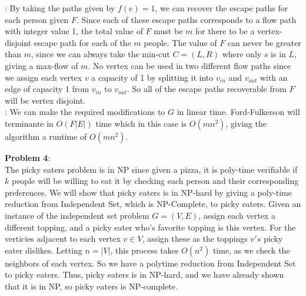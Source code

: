 \documentclass{article}
\begin{document}
: By taking the paths given by $f(e) = 1$, we can recover the escape paths for each person given $F$. Since each of these escape paths corresponds to a flow path with integer value 1, the total value of $F$ must be $m$ for there to be a vertex-disjoint escape path for each of the $m$ people. The value of $F$ can never be greater than $m$, since we can always take the min-cut $C = (L, R)$ where only $s$ is in $L$, giving a max-flow of $m$. No vertex can be used in two different flow paths since we assign each vertex $v$ a capacity of 1 by splitting it into $v_{in}$ and $v_{out}$ with an edge of capacity 1 from $v_{in}$ to $v_{out}$. So all of the escape paths recoverable from $F$ will be vertex disjoint. \\[0.5ex]
: We can make the required modifications to $G$ in linear time. Ford-Fulkerson will terminante in $O(F|E|)$ time which in this case is $O(mn^2)$, giving the algorithm a runtime of $O(mn^2)$.

\textbf{Problem 4}: \\[1.0ex]
The picky eaters problem is in NP since given a pizza, it is poly-time verifiable if $k$ people will be willing to eat it by checking each person and their corresponding preferences. We will show that picky eaters is in NP-hard by giving a poly-time reduction from Independent Set, which is NP-Complete, to picky eaters. Given an instance of the independent set problem $G = (V, E)$, assign each vertex a different topping, and a picky eater who's favorite topping is this vertex. For the verticies adjacent to each vertex $v \in V$, assign these as the toppings $v's$ picky eater dislikes. Letting $n = |V|$, this process takes $O(n^2)$ time, as we check the neighbors of each vertex. So we have a polytime reduction from Independent Set to picky eaters. Thus, picky eaters is in NP-hard, and we have already shown that it is in NP, so picky eaters is NP-complete.  
\end{document}
